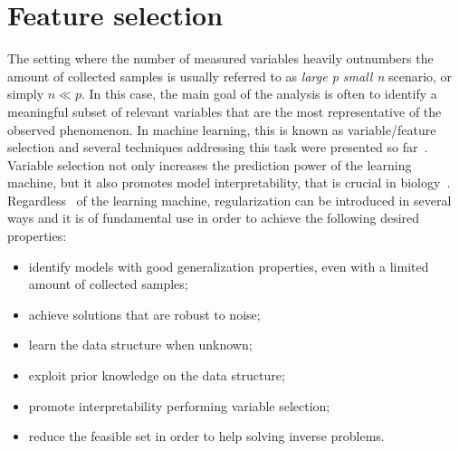   \section{Feature selection} \label{subsec:feature_selection}
  
%  
  
  The setting where the number of measured variables heavily outnumbers the amount of collected samples is usually referred to as \textit{large p small n} scenario, or simply $n \ll p$. In this case, the main goal of the analysis is often to identify a meaningful subset of relevant variables that are the most representative of the observed phenomenon. In machine learning, this is known as variable/feature selection and several techniques addressing this task were presented so far~\cite{guyon2002gene}. Variable selection not only increases the prediction power of the learning machine, but it also promotes model interpretability, that is crucial in biology~\cite{altmann2010permutation}.
  Regardless~\citep{okser2014regularized} of the learning machine, regularization can be introduced in several ways and it is of fundamental use in order to achieve the following desired properties:
  \begin{itemize}
  	\item identify models with good generalization properties, even with a limited amount of collected samples;
  	\item achieve solutions that are robust to noise;
  	\item learn the data structure when unknown;
  	\item exploit prior knowledge on the data structure;
  	\item promote interpretability performing variable selection;
  	\item reduce the feasible set in order to help solving inverse problems. %
  \end{itemize}

